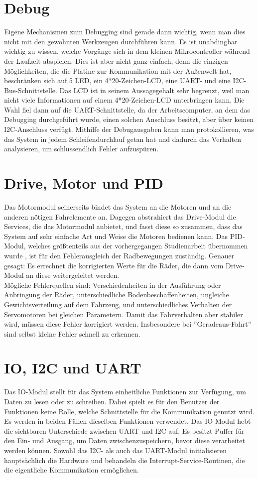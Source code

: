 \section{Debug}
Eigene Mechanismen zum Debugging sind gerade dann wichtig, wenn man dies nicht mit den
gewohnten Werkzeugen durchführen kann.
Es ist unabdingbar wichtig zu wissen, welche Vorgänge sich in dem kleinen Mikrocontroller
während der Laufzeit abspielen.
Dies ist aber nicht ganz einfach, denn die einzigen Möglichkeiten, die die Platine zur
Kommunikation mit der Außenwelt hat, beschränken sich auf
5 LED, ein 4*20-Zeichen-LCD, eine UART- und eine I2C-Bus-Schnittstelle.
Das LCD ist in seinem Aussagegehalt sehr
begrenzt, weil man nicht viele Informationen auf einem 4*20-Zeichen-LCD unterbringen kann. 
Die Wahl fiel dann auf
die UART-Schnittstelle, da der Arbeitscomputer, an dem das Debugging durchgeführt wurde,
einen solchen Anschluss besitzt, aber über keinen I2C-Anschluss verfügt.
Mithilfe der Debugausgaben kann man protokollieren, was das System in jedem
Schleifendurchlauf getan hat und dadurch das Verhalten analysieren, um schlussendlich
Fehler aufzuspüren. 
\section{Drive, Motor und PID}
Das Motormodul seinerseits bindet das System an die Motoren und an die anderen nötigen
Fahrelemente an. Dagegen abstrahiert das Drive-Modul die Services, die das Motormodul anbietet,
und fasst diese so zusammen, dass das System auf sehr einfache Art und Weise die Motoren bedienen
kann.
Das PID-Modul, welches größtenteils aus der vorhergegangen Studienarbeit übernommen wurde
\cite{STUD_TIMO}, ist für den Fehlerausgleich der Radbewegungen zuständig. Genauer gesagt: Es
errechnet die korrigierten Werte für die Räder, die dann vom Drive-Modul an diese 
weitergeleitet werden.\\
Mögliche Fehlerquellen sind: Verschiedenheiten in der Ausführung oder Anbringung der Räder,
unterschiedliche Bodenbeschaffenheiten,
ungleiche Gewichtsverteilung auf dem Fahrzeug, und unterschiedliches Verhalten der
Servomotoren bei gleichen Parametern.
Damit das Fahrverhalten aber stabiler wird, müssen diese Fehler korrigiert werden.
Insbesondere bei ''Geradeaus-Fahrt'' sind selbst kleine Fehler schnell zu erkennen.
\section{IO, I2C und UART}
Das IO-Modul stellt für das System einheitliche Funktionen zur Verfügung, um Daten zu lesen
oder zu schreiben. 
Dabei spielt es für den Benutzer der Funktionen keine Rolle, welche Schnittstelle
für die Kommunikation genutzt wird.
Es werden in beiden Fällen dieselben Funktionen verwendet.
Das IO-Modul hebt die sichtbaren Unterschiede zwischen UART und I2C auf. Es besitzt Puffer für den
Ein- und Ausgang, um Daten zwischenzuspeichern, bevor diese verarbeitet werden können.
Sowohl das I2C- als auch das UART-Modul initialisieren hauptsächlich die Hardware und
behandeln die Interrupt-Service-Routinen, die die eigentliche Kommunikation ermöglichen.
